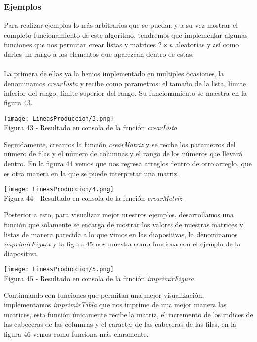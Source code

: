 \documentclass[12pt,twoside]{article}
\begin{document}
\subsubsection{Ejemplos}
Para realizar ejemplos lo más arbitrarios que se puedan y a su vez mostrar el completo funcionamiento de este algoritmo, tendremos que implementar algunas funciones que nos permitan crear listas y matrices $2\times n$ aleatorias y así como darles un rango a los elementos que aparezcan dentro de estas.\\\\
La primera de ellas ya la hemos implementado en multiples ocasiones, la denominamos \textit{crearLista} y recibe como parametros: el tamaño de la lista, límite inferior del rango, límite superior del rango. Su funcionamiento se muestra en la figura 43.
\begin{center}
    \texttt{[image: LineasProduccion/3.png]}\\
    Figura 43 - Resultado en consola de la función \textit{crearLista}
\end{center}
Seguidamente, creamos la función \textit{crearMatriz} y se recibe los parametros del número de filas y el número de columnas y el rango de los números que llevará dentro. En la figura 44 vemos que nos regresa arreglos dentro de otro arreglo, que es otra manera en la que se puede interpretar una matriz.
\begin{center}
    \texttt{[image: LineasProduccion/4.png]}\\
    Figura 44 - Resultado en consola de la función \textit{crearMatriz}
\end{center}
Posterior a esto, para visualizar mejor nuestros ejemplos, desarrollamos una función que solamente se encarga de mostrar los valores de nuestras matrices y listas de manera parecida a lo que vimos en las diapositivas, la denominamos \textit{imprimirFigura} y la figura 45 nos muestra como funciona con el ejemplo de la diapositiva.
\begin{center}
    \texttt{[image: LineasProduccion/5.png]}\\
    Figura 45 - Resultado en consola de la función \textit{imprimirFigura}
\end{center}
Continuando con funciones que permitan una mejor visualización, implementamos \textit{imprimirTabla} que nos imprime de una mejor manera las matrices, esta función únicamente recibe la matriz, el incremento de los indices de las cabeceras de las columnas y el caracter de las cabeceras de las filas, en la figura 46 vemos como funciona más claramente.
\end{document}
